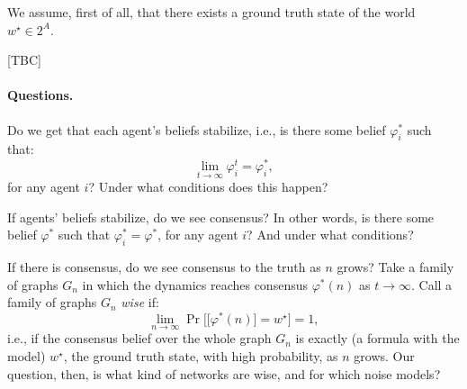 \documentclass{scrartcl}
\theoremstyle{definition}
\renewcommand{\phi}{\varphi}
\begin{document}
We assume, first of all, that there exists a ground truth state of the world 
$w^\star \in 2^A$.

[TBC]

\paragraph{Questions.}
Do we get that each agent's beliefs stabilize, i.e., is there some belief $\phi_i^*$ 
such that:
$$
    \lim_{t \rightarrow \infty} \phi_i^t = \phi_i^*,
$$
for any agent $i$? Under what conditions does this happen?

If agents' beliefs stabilize, do we see consensus? In other words, 
is there some belief $\phi^*$ such that $\phi_i^* = \phi^*$,
for any agent $i$? And under what conditions?

If there is consensus, do we see consensus to the truth as $n$ grows? 
Take a family of graphs $G_n$ in which the dynamics 
reaches consensus $\phi^*(n)$ as $t \rightarrow \infty$.
Call a family of graphs $G_n$ \emph{wise} if:
$$
    \lim_{n \rightarrow \infty} {\Pr}\Big[ \big[\phi^*(n)\big] = w^\star \Big] = 1,
$$   
i.e., if the consensus belief over the whole graph $G_n$ is exactly (a formula with the model) $w^\star$,
the ground truth state, with high probability, as $n$ grows.    
Our question, then, is what kind of networks are wise, and for which noise models?


% 
\end{document}
